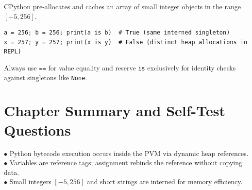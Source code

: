 \begin{examtip}
CPython pre-allocates and caches an array of small integer objects in the range $[-5, 256]$.
\begin{lstlisting}
a = 256; b = 256; print(a is b)  # True (same interned singleton)
x = 257; y = 257; print(x is y)  # False (distinct heap allocations in REPL)
\end{lstlisting}
Always use \texttt{==} for value equality and reserve \texttt{is} exclusively for identity checks against singletons like \texttt{None}.
\end{examtip}

\section{Chapter Summary and Self-Test Questions}
\begin{summarybox}
$\bullet$ Python bytecode execution occurs inside the PVM via dynamic heap references.\\
$\bullet$ Variables are reference tags; assignment rebinds the reference without copying data.\\
$\bullet$ Small integers $[-5, 256]$ and short strings are interned for memory efficiency.
\end{summarybox}

